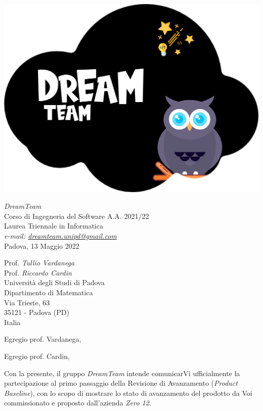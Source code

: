 \documentclass[a4paper]{scrlttr2}
\begin{document}
\includegraphics[scale=0.05]{DreamTeam.png}

\begin{flushright}
\textit{DreamTeam} \\
Corso di Ingegneria del Software A.A. 2021/22 \\
Laurea Triennale in Informatica \\
\textsl{e-mail: \href{mailto:dreamteam.unipd@gmail.com}{dreamteam.unipd@gmail.com}} \\
Padova, 13 Maggio 2022
\end{flushright}

\begin{flushleft}
{Prof. \textit{Tullio Vardanega} \\ Prof. \textit{Riccardo Cardin} \\
Università degli Studi di Padova \\
Dipartimento di Matematica \\
Via Trieste, 63 \\
35121 - Padova (PD) \\ 
Italia}
\end{flushleft}

\vspace*{15px}

Egregio prof. Vardanega,  

Egregio prof. Cardin, 

\vspace*{10px}

Con la presente, il gruppo \textit{DreamTeam} intende comunicarVi ufficialmente la partecipazione al primo passaggio della Revisione di Avanzamento (\textit{Product Baseline}), con lo scopo di mostrare lo stato di avanzamento del prodotto da Voi commissionato e proposto dall'azienda \textit{Zero 12}.
\end{document}
